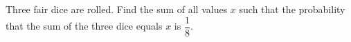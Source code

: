 Three fair dice are rolled. Find the sum of all values $x$ such that the probability that the sum of the three dice equals $x$ is $\dfrac{1}{8}$.
